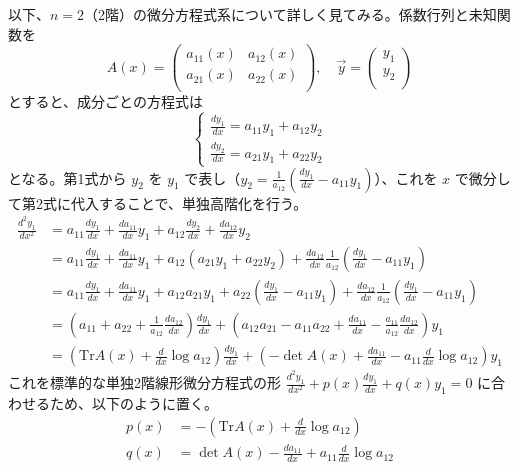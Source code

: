 以下、$n=2$（2階）の微分方程式系について詳しく見てみる。係数行列と未知関数を
\[
A(x)=
\begin{pmatrix}
    a_{11}(x) & a_{12}(x)\\
    a_{21}(x) & a_{22}(x)\\
\end{pmatrix},
\quad 
\vec{y}=
\begin{pmatrix}
    y_{1}\\
    y_{2}\\
\end{pmatrix}
\]
とすると、成分ごとの方程式は
\[
\begin{cases}
\frac{dy_{1}}{dx}=a_{11}y_{1}+a_{12}y_{2}\\
\frac{dy_{2}}{dx}=a_{21}y_{1}+a_{22}y_{2}
\end{cases}
\]
となる。第1式から $y_2$ を $y_1$ で表し（$y_2 = \frac{1}{a_{12}}(\frac{dy_{1}}{dx}-a_{11}y_{1})$）、これを $x$ で微分して第2式に代入することで、単独高階化を行う。
\begin{align*}
\frac{d^{2}y_{1}}{dx^{2}} &= a_{11}\frac{dy_{1}}{dx} + \frac{da_{11}}{dx}y_{1} + a_{12}\frac{dy_{2}}{dx} + \frac{da_{12}}{dx}y_{2}\\
&= a_{11}\frac{dy_{1}}{dx} + \frac{da_{11}}{dx}y_{1} + a_{12}(a_{21}y_{1}+a_{22}y_{2}) + \frac{da_{12}}{dx}\frac{1}{a_{12}}\left(\frac{dy_{1}}{dx}-a_{11}y_{1}\right)\\
&= a_{11}\frac{dy_{1}}{dx} + \frac{da_{11}}{dx}y_{1} + a_{12}a_{21}y_{1} + a_{22}\left(\frac{dy_{1}}{dx}-a_{11}y_{1}\right) + \frac{da_{12}}{dx}\frac{1}{a_{12}}\left(\frac{dy_{1}}{dx}-a_{11}y_{1}\right)\\
&= \left(a_{11} + a_{22} + \frac{1}{a_{12}}\frac{da_{12}}{dx}\right)\frac{dy_{1}}{dx} + \left(a_{12}a_{21} - a_{11}a_{22} + \frac{da_{11}}{dx} - \frac{a_{11}}{a_{12}}\frac{da_{12}}{dx}\right)y_{1}\\
&= \left(\text{Tr} A(x) + \frac{d}{dx}\log a_{12}\right)\frac{dy_{1}}{dx} + \left(-\det A(x) + \frac{da_{11}}{dx} - a_{11}\frac{d}{dx}\log a_{12}\right)y_{1}
\end{align*}
これを標準的な単独2階線形微分方程式の形 $\frac{d^{2}y_{1}}{dx^{2}} + p(x)\frac{dy_{1}}{dx} + q(x)y_{1} = 0$ に合わせるため、以下のように置く。
\begin{align*}
p(x) &= -\left(\text{Tr} A(x) + \frac{d}{dx}\log a_{12}\right)\\
q(x) &= \det A(x) - \frac{da_{11}}{dx} + a_{11}\frac{d}{dx}\log a_{12}
\end{align*}

